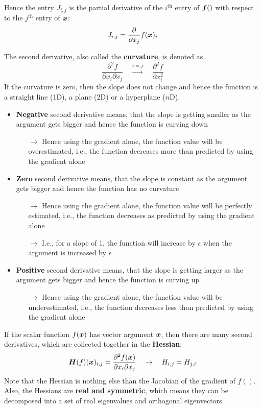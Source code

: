 \begin{multicols}{2}
	Hence the entry $J_{i,j}$ is the partial derivative of the $i^{\text{th}}$ entry of $\bol{f}()$ with respect to the $j^{\text{th}}$ entry of $\bol{x}$:
	\[ J_{i,j} = \frac{\partial}{\partial x_j} f(\bol{x})_i \]
	
	The second derivative, also called the \textbf{curvature}, is denoted as
	\[ \frac{\partial^2 f}{\partial x_i \partial x_j} \quad\overset{i=j}{\rightarrow}\quad 
	\frac{\partial^2 f}{\partial x_i^2} \] 
	If the curvature is zero, then the slope does not change and hence the function is a straight line (1D), a plane (2D) or a hyperplane ($n$D).
	\begin{itemize}
		\item \textbf{Negative} second derivative means, that the slope is getting smaller as the argument gets bigger and hence the function is curving down
		\begin{itemize}
			\item[$\rightarrow$] Hence using the gradient alone, the function value will be overestimated, i.e., the function decreases more than predicted by using the gradient alone
		\end{itemize}
		\item \textbf{Zero} second derivative means, that the slope is constant as the argument gets bigger and hence the function has no curvature
		\begin{itemize}
			\item[$\rightarrow$] Hence using the gradient alone, the function value will be perfectly estimated, i.e., the function decreases as predicted by using the gradient alone
			\item[$\rightarrow$] I.e., for a slope of 1, the function will increase by $\epsilon$ when the argument is increased by $\epsilon$
		\end{itemize}
		\item \textbf{Positive} second derivative means, that the slope is getting larger as the argument gets bigger and hence the function is curving up
		\begin{itemize}
			\item[$\rightarrow$] Hence using the gradient alone, the function value will be underestimated, i.e., the function decreases less than predicted by using the gradient alone
		\end{itemize}
	\end{itemize}
	
	If the scalar function $f(\bol{x})$ has vector argument $\bol{x}$, then there are many second derivatives, which are collected together in the \textbf{Hessian}:
	\[ \bol{H}(f)(\bol{x})_{i,j} = \frac{\partial^2 f(\bol{x})}{\partial x_i\partial x_j} 
	\quad\rightarrow\quad H_{i,j}=H_{j,i} \]
	Note that the Hessian is nothing else than the Jacobian of the gradient of $f()$.
	Also, the Hessians are \textbf{real and symmetric}, which means they can be decomposed into a set of real eigenvalues and orthogonal eigenvectors.\\
	

\end{multicols}

